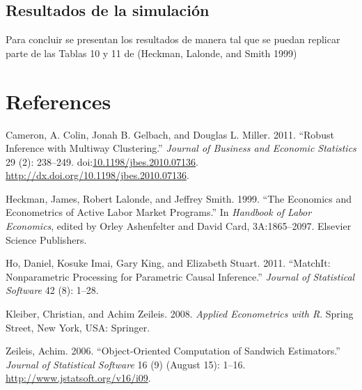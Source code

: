 \documentclass[]{article}
\begin{document}
\subsection{Resultados de la
simulación}\label{resultados-de-la-simulacion}

Para concluir se presentan los resultados de manera tal que se puedan
replicar parte de las Tablas 10 y 11 de (Heckman, Lalonde, and Smith
1999)

\newpage

\section{References}\label{references}

Cameron, A. Colin, Jonah B. Gelbach, and Douglas L. Miller. 2011.
``Robust Inference with Multiway Clustering.'' \emph{Journal of Business
and Economic Statistics} 29 (2): 238--249.
doi:\href{http://dx.doi.org/10.1198/jbes.2010.07136}{10.1198/jbes.2010.07136}.
\url{http://dx.doi.org/10.1198/jbes.2010.07136}.

Heckman, James, Robert Lalonde, and Jeffrey Smith. 1999. ``The Economics
and Econometrics of Active Labor Market Programs.'' In \emph{Handbook of
Labor Economics}, edited by Orley Ashenfelter and David Card,
3A:1865--2097. Elsevier Science Publishers.

Ho, Daniel, Kosuke Imai, Gary King, and Elizabeth Stuart. 2011.
``MatchIt: Nonparametric Processing for Parametric Causal Inference.''
\emph{Journal of Statistical Software} 42 (8): 1--28.

Kleiber, Christian, and Achim Zeileis. 2008. \emph{Applied Econometrics
with R}. Spring Street, New York, USA: Springer.

Zeileis, Achim. 2006. ``Object-Oriented Computation of Sandwich
Estimators.'' \emph{Journal of Statistical Software} 16 (9) (August 15):
1--16. \url{http://www.jstatsoft.org/v16/i09}.
\end{document}
